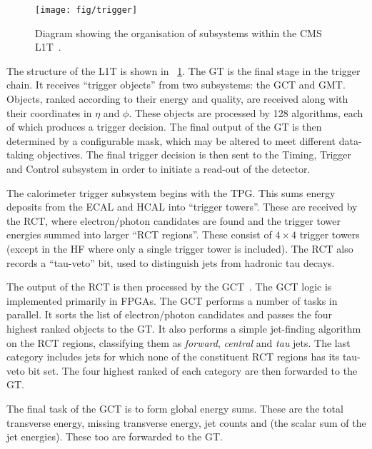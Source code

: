 \begin{figure}[h!]
\centering
\texttt{[image: fig/trigger]}
\caption[Diagram showing the organisation of the \acs{CMS} \acs{L1T}]{Diagram
  showing the organisation of subsystems within the \ac{CMS} \ac{L1T}~\cite{cms_jinst}.}
\label{fig:expt_cms_trigger}
\end{figure}

The structure of the \ac{L1T} is shown in \fig~\ref{fig:expt_cms_trigger}. The
\ac{GT} is the final stage in the trigger chain. It receives ``trigger objects''
from two subsystems: the \ac{GCT} and \ac{GMT}. Objects, ranked according to
their energy and quality, are received along with their coordinates in $\eta$
and $\phi$. These objects are processed by 128 algorithms, each of which
produces a trigger decision. The final output of the \ac{GT} is then determined
by a configurable mask, which may be altered to meet different data-taking
objectives. The final trigger decision is then sent to the Timing, Trigger and
Control subsystem in order to initiate a read-out of the detector.

The calorimeter trigger subsystem begins with the \ac{TPG}. This sums energy
deposits from the \ac{ECAL} and \ac{HCAL} into ``trigger towers''. These are
received by the \ac{RCT}, where electron/photon candidates are found and the
trigger tower energies summed into larger ``\ac{RCT} regions''. These consist
of $4\times 4$ trigger towers (except in the \ac{HF} where only a single trigger
tower is included). The \ac{RCT} also records a ``tau-veto'' bit, used to
distinguish jets from hadronic tau decays.

The output of the \ac{RCT} is then processed by the
\ac{GCT}~\cite{jj_thesis}. The \ac{GCT} logic is implemented primarily in
\acp{FPGA}. The \ac{GCT} performs a number of tasks in parallel. It sorts the
list of electron/photon candidates and passes the four highest ranked objects to
the \ac{GT}. It also performs a simple jet-finding algorithm on the \ac{RCT}
regions, classifying them as \emph{forward}, \emph{central} and \emph{tau}
jets. The last category includes jets for which none of the constituent \ac{RCT}
regions has its tau-veto bit set. The four highest ranked of each category are
then forwarded to the \ac{GT}.

The final task of the \ac{GCT} is to form global energy sums. These are the
total transverse energy, missing transverse energy, jet counts and \HT (the
scalar sum of the jet energies). These too are forwarded to the \ac{GT}.

